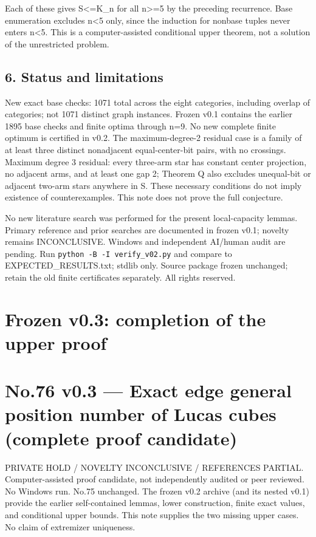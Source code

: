 \documentclass[
  10pt,
]{article}
\begin{document}
Each of these gives \textbar S\textbar\textless=K\_n for all
n\textgreater=5 by the preceding recurrence. Base enumeration excludes
n\textless5 only, since the induction for nonbase tuples never enters
n\textless5. This is a computer-assisted conditional upper theorem, not
a solution of the unrestricted problem.

\subsection{6. Status and limitations}\label{status-and-limitations}

New exact base checks: 1071 total across the eight categories, including
overlap of categories; not 1071 distinct graph instances. Frozen v0.1
contains the earlier 1895 base checks and finite optima through n=9. No
new complete finite optimum is certified in v0.2. The maximum-degree-2
residual case is a family of at least three distinct nonadjacent
equal-center-bit pairs, with no crossings. Maximum degree 3 residual:
every three-arm star has constant center projection, no adjacent arms,
and at least one gap 2; Theorem Q also excludes unequal-bit or adjacent
two-arm stars anywhere in S. These necessary conditions do not imply
existence of counterexamples. This note does not prove the full
conjecture.

No new literature search was performed for the present local-capacity
lemmas. Primary reference and prior searches are documented in frozen
v0.1; novelty remains INCONCLUSIVE. Windows and independent AI/human
audit are pending. Run \texttt{python\ -B\ -I\ verify\_v02.py} and
compare to EXPECTED\_RESULTS.txt; stdlib only. Source package frozen
unchanged; retain the old finite certificates separately. All rights
reserved.

\newpage

\section{Frozen v0.3: completion of the upper
proof}\label{frozen-v0.3-completion-of-the-upper-proof}

\section{No.76 v0.3 --- Exact edge general position number of Lucas
cubes (complete proof
candidate)}\label{no.76-v0.3-exact-edge-general-position-number-of-lucas-cubes-complete-proof-candidate}

PRIVATE HOLD / NOVELTY INCONCLUSIVE / REFERENCES PARTIAL.
Computer-assisted proof candidate, not independently audited or peer
reviewed. No Windows run. No.75 unchanged. The frozen v0.2 archive (and
its nested v0.1) provide the earlier self-contained lemmas, lower
construction, finite exact values, and conditional upper bounds. This
note supplies the two missing upper cases. No claim of extremizer
uniqueness.
\end{document}
